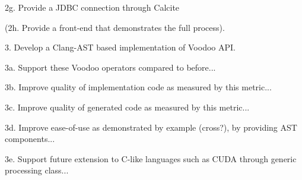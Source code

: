 2g. Provide a JDBC connection through Calcite

(2h. Provide a front-end that demonstrates the full process).

3. Develop a Clang-AST based implementation of Voodoo API.

3a. Support these Voodoo operators compared to before...

3b. Improve quality of implementation code as measured by this metric...

3c. Improve quality of generated code as measured by this metric...

3d. Improve ease-of-use as demonstrated by example (cross?), by providing AST components...

3e. Support future extension to C-like languages such as CUDA through generic processing class...

